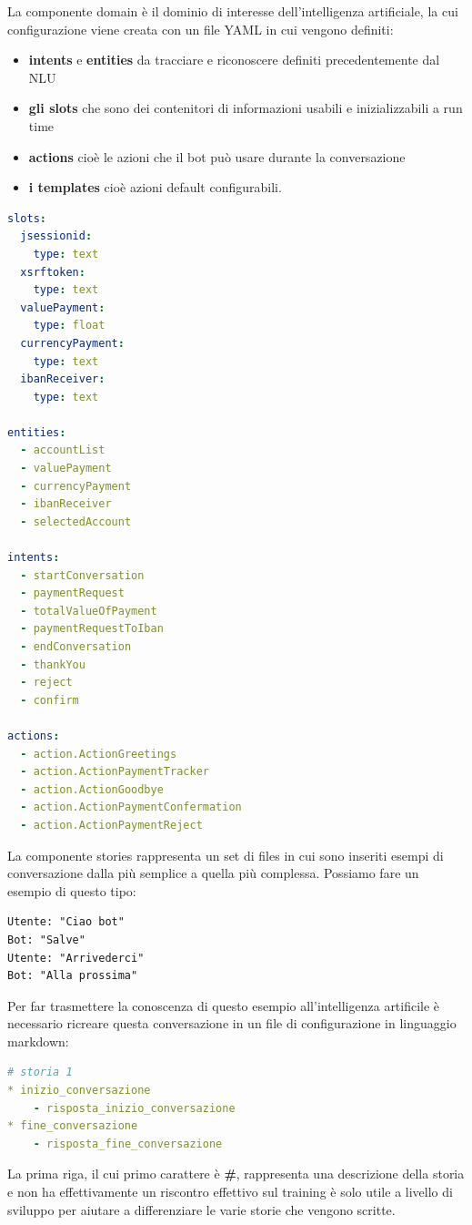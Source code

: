 La componente domain è il dominio di interesse dell'intelligenza artificiale, la cui configurazione viene creata con un file YAML in cui vengono definiti: \begin{itemize}
\item \textbf{intents} e \textbf{entities} da tracciare e riconoscere definiti precedentemente dal NLU
\item \textbf{gli slots} che sono dei contenitori di informazioni usabili e inizializzabili a run time
\item \textbf{actions} cioè le azioni che il bot può usare durante la conversazione
\item \textbf{i templates} cioè azioni default configurabili.
\end{itemize}
\begin{lstlisting}[language=yaml,firstnumber=1]
slots:
  jsessionid:
    type: text
  xsrftoken:
    type: text
  valuePayment:
    type: float
  currencyPayment:
    type: text
  ibanReceiver:
    type: text

entities:
  - accountList
  - valuePayment
  - currencyPayment
  - ibanReceiver
  - selectedAccount

intents:
  - startConversation
  - paymentRequest
  - totalValueOfPayment
  - paymentRequestToIban
  - endConversation
  - thankYou
  - reject
  - confirm

actions:
  - action.ActionGreetings
  - action.ActionPaymentTracker
  - action.ActionGoodbye
  - action.ActionPaymentConfermation
  - action.ActionPaymentReject
\end{lstlisting}
La componente stories rappresenta un set di files in cui sono inseriti esempi di conversazione dalla più semplice a quella più complessa. Possiamo fare un esempio di questo tipo:
\begin{lstlisting}
Utente: "Ciao bot"
Bot: "Salve"
Utente: "Arrivederci"
Bot: "Alla prossima"
\end{lstlisting}
Per far trasmettere la conoscenza di questo esempio all'intelligenza artificile è necessario ricreare questa conversazione in un file di configurazione in linguaggio markdown:
\begin{lstlisting}[language=yaml]
# storia 1
* inizio_conversazione
    - risposta_inizio_conversazione
* fine_conversazione
    - risposta_fine_conversazione
\end{lstlisting}
La prima riga, il cui primo carattere è \textbf{\#}, rappresenta una descrizione della storia e non ha effettivamente un riscontro effettivo sul training è solo utile a livello di sviluppo per aiutare a differenziare le varie storie che vengono scritte.
